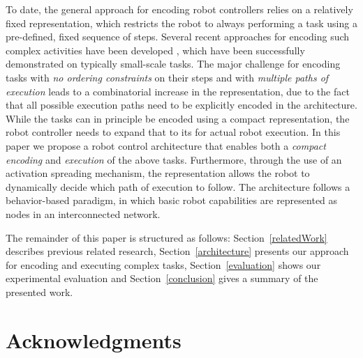 \documentclass[conference]{article}
\begin{document}
To date, the general approach for encoding robot controllers relies on a relatively fixed representation, which restricts the robot to always performing a task using a pre-defined, fixed sequence of steps. Several recent approaches for encoding such complex activities have been developed \cite{koppula2013anticipating}\cite{hawkins2014anticipating}, which have been successfully demonstrated on typically small-scale tasks. The major challenge for encoding tasks with {\it no ordering constraints} on their steps and with {\it multiple paths of execution} leads to a combinatorial increase in the representation, due to the fact that all possible execution paths need to be explicitly encoded in the architecture. While the tasks can in principle be encoded using a compact representation, the robot controller needs to expand that to its for actual robot execution. In this paper we propose a robot control architecture that enables both a {\it compact encoding} and {\it execution} of the above tasks. Furthermore, through the use of an activation spreading mechanism, the representation allows the robot to dynamically decide which path of execution to follow. The architecture follows a behavior-based paradigm, in which basic robot capabilities are represented as nodes in an interconnected network. 

The remainder of this paper is structured as follows: Section~\ref{relatedWork} describes previous related research, Section~\ref{architecture} presents our approach for encoding and executing complex tasks, Section~\ref{evaluation} shows our experimental evaluation and Section~\ref{conclusion} gives a summary of the presented work.
\section*{Acknowledgments}





\end{document}
